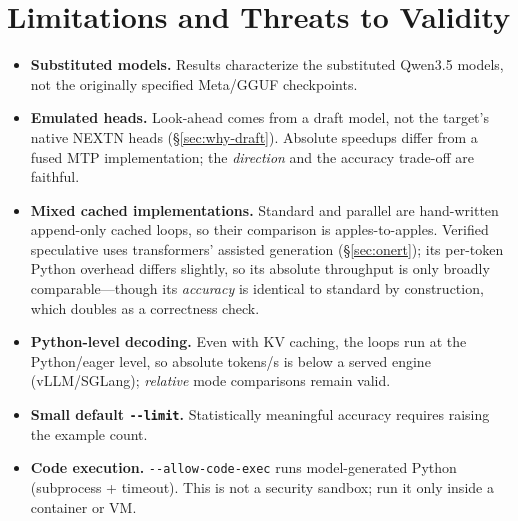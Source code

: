 \documentclass[11pt]{article}
\begin{document}
\section{Limitations and Threats to Validity}
\label{sec:limitations}
\begin{itemize}[nosep]
  \item \textbf{Substituted models.} Results characterize the substituted Qwen3.5
        models, not the originally specified Meta/GGUF checkpoints.
  \item \textbf{Emulated heads.} Look-ahead comes from a draft model, not the
        target's native NEXTN heads (\S\ref{sec:why-draft}). Absolute speedups
        differ from a fused MTP implementation; the \emph{direction} and the
        accuracy trade-off are faithful.
  \item \textbf{Mixed cached implementations.} Standard and parallel are
        hand-written append-only cached loops, so their comparison is
        apples-to-apples. Verified speculative uses transformers' assisted
        generation (\S\ref{sec:onert}); its per-token Python overhead differs
        slightly, so its absolute throughput is only broadly comparable---though
        its \emph{accuracy} is identical to standard by construction, which
        doubles as a correctness check.
  \item \textbf{Python-level decoding.} Even with KV caching, the loops run at
        the Python/eager level, so absolute tokens/s is below a served engine
        (vLLM/SGLang); \emph{relative} mode comparisons remain valid.
  \item \textbf{Small default \texttt{-{}-limit}.} Statistically meaningful
        accuracy requires raising the example count.
  \item \textbf{Code execution.} \texttt{-{}-allow-code-exec} runs
        model-generated Python (subprocess + timeout). This is not a security
        sandbox; run it only inside a container or VM.
\end{itemize}

\end{document}
